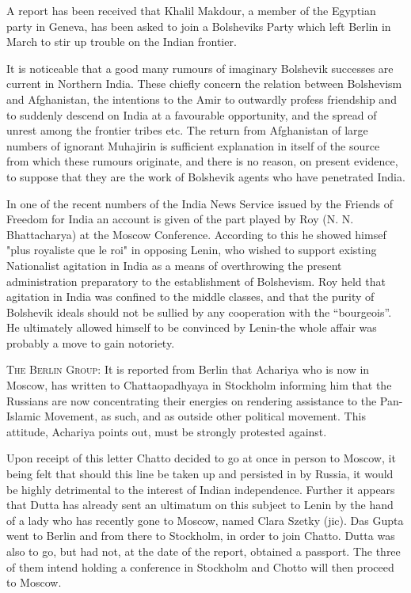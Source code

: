 A report has been received that Khalil Makdour, a member of the Egyptian party in Geneva, has been asked to join a Bolsheviks Party which left Berlin in March to stir up trouble on the Indian frontier. 

It is noticeable that a good many rumours of imaginary Bolshevik successes are current in Northern India. These chiefly concern the relation between Bolshevism and Afghanistan, the intentions to the Amir to outwardly profess friendship and to suddenly descend on India at a favourable opportunity, and the spread of unrest among the frontier tribes etc. The return from Afghanistan of large numbers of ignorant Muhajirin is sufficient explanation in itself of the source from which these rumours originate, and there is no reason, on present evidence, to suppose that they are the work of Bolshevik agents who have penetrated India. 

In one of the recent numbers of the India News Service issued by the Friends of Freedom for India an account is given of the part played by Roy (N. N. Bhattacharya) at the Moscow Conference. According to this he showed himsef "plus royaliste que le roi" in opposing Lenin, who wished to support existing Nationalist agitation in India as a means of overthrowing the present administration preparatory to the establishment of Bolshevism. Roy held that agitation in India was confined to the middle classes, and that the purity of Bolshevik ideals should not be sullied by any cooperation with the “bourgeois”. He ultimately allowed himself to be convinced by Lenin-the whole affair was probably a move to gain notoriety. 

\textsc{The Berlin Group:} It is reported from Berlin that Achariya who is now in Moscow, has written to Chattaopadhyaya in Stockholm informing him that the Russians are now concentrating their energies on rendering assistance to the Pan-Islamic Movement, as such, and as outside other political movement. This attitude, Achariya points out, must be strongly protested against. 

Upon receipt of this letter Chatto decided to go at once in person to Moscow, it being felt that should this line be taken up and persisted in by Russia, it would be highly detrimental 
to the interest of Indian independence. Further it appears that Dutta has already sent an ultimatum on this subject to Lenin by the hand of a lady who has recently gone to Moscow, named Clara Szetky (jic). Das Gupta went to Berlin and from there to Stockholm, in order to join Chatto. Dutta was also to go, but had not, at the date of the report, obtained a passport. The three of them intend holding a conference in Stockholm and Chotto will then proceed to Moscow. 

